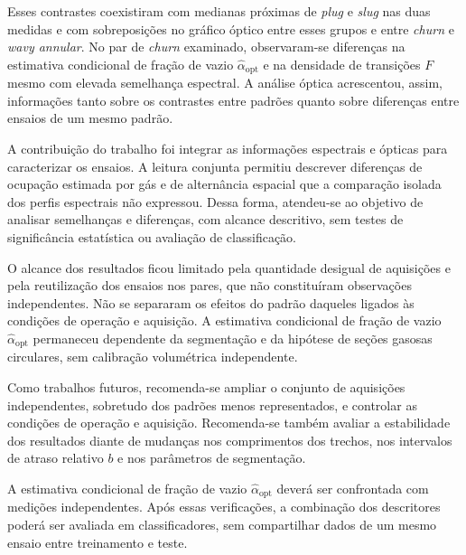 Esses contrastes coexistiram com medianas próximas de \textit{plug} e
\textit{slug} nas duas medidas e com sobreposições no gráfico óptico entre
esses grupos e entre \textit{churn} e \textit{wavy annular}.
No par de \textit{churn} examinado, observaram-se diferenças na estimativa
condicional de fração de vazio $\widehat\alpha_{\mathrm{opt}}$ e na densidade
de transições $F$ mesmo com elevada semelhança espectral. A análise óptica
acrescentou, assim, informações tanto sobre os contrastes entre padrões
quanto sobre diferenças entre ensaios de um mesmo padrão.

A contribuição do trabalho foi integrar as informações espectrais e
ópticas para caracterizar os ensaios. A leitura conjunta permitiu descrever
diferenças de ocupação estimada por gás e de alternância espacial que a
comparação isolada dos perfis espectrais não expressou. Dessa forma,
atendeu-se ao objetivo de analisar semelhanças e diferenças, com alcance
descritivo, sem testes de significância estatística ou avaliação de classificação.

O alcance dos resultados ficou limitado pela quantidade desigual de
aquisições e pela reutilização dos ensaios nos pares, que não constituíram
observações independentes. Não se separaram os efeitos do padrão daqueles
ligados às condições de operação e aquisição. A estimativa condicional de
fração de vazio $\widehat\alpha_{\mathrm{opt}}$ permaneceu dependente da
segmentação e da hipótese de seções gasosas circulares, sem calibração
volumétrica independente.

Como trabalhos futuros, recomenda-se ampliar o conjunto de aquisições
independentes, sobretudo dos padrões menos representados, e controlar as
condições de operação e aquisição. Recomenda-se também avaliar a
estabilidade dos resultados diante de mudanças nos comprimentos dos trechos,
nos intervalos de atraso relativo
$b$ e nos parâmetros de segmentação.

A estimativa condicional de fração de vazio $\widehat\alpha_{\mathrm{opt}}$
deverá ser confrontada com medições independentes. Após essas verificações,
a combinação dos descritores poderá ser avaliada em classificadores,
sem compartilhar dados de um mesmo ensaio entre treinamento e teste.

